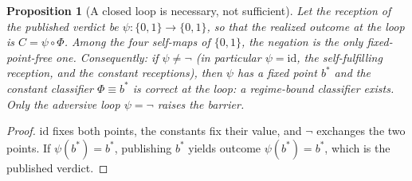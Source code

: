 \documentclass[11pt]{article}
\theoremstyle{plain}
\newtheorem{proposition}[theorem]{Proposition}
\theoremstyle{definition}
\theoremstyle{remark}
\begin{document}
\begin{proposition}[A closed loop is necessary, not sufficient]\label{prop:loop}
Let the reception of the published verdict be $\psi:\{0,1\}\to\{0,1\}$, so that the realized outcome at the loop is $C=\psi\circ\Phi$. Among the four self-maps of $\{0,1\}$, the negation is the only fixed-point-free one. Consequently: if $\psi\ne\lnot$ (in particular $\psi=\mathrm{id}$, the self-fulfilling reception, and the constant receptions), then $\psi$ has a fixed point $b^*$ and the constant classifier $\Phi\equiv b^*$ is correct at the loop: a regime-bound classifier exists. Only the adversive loop $\psi=\lnot$ raises the barrier.
\end{proposition}
\begin{proof}
$\mathrm{id}$ fixes both points, the constants fix their value, and $\lnot$ exchanges the two points. If $\psi(b^*)=b^*$, publishing $b^*$ yields outcome $\psi(b^*)=b^*$, which is the published verdict.
\end{proof}
\end{document}
